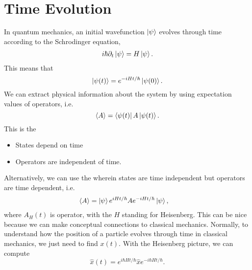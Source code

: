 \documentclass{article}
\numberwithin{equation}{section}
\begin{document}
\section{Time Evolution}
In quantum mechanics, an initial wavefunction $\ket{\psi}$ evolves through time according to the Schrodinger equation,
\begin{align}
    i\hbar\partial_t\ket{\psi} = H\ket{\psi}.
\end{align}
This means that 
\begin{equation}
    \ket{\psi(t)} = e^{-iHt/\hbar}\ket{\psi(0)}.
\end{equation}
We can extract physical information about the system by using expectation values of operators, i.e. 
\begin{equation}
    \langle A\rangle = \bra{\psi(t)}A\ket{\psi(t)}.
\end{equation}
This is the 
\begin{itemize}
    \item States depend on time
    \item Operators are independent of time.
\end{itemize}
Alternatively, we can use the  wherein states are time independent but operators are time dependent, i.e. 
\begin{align}
    \langle A\rangle &= \ket{\psi}e^{iHt/\hbar}Ae^{-iHt/\hbar}\ket{\psi},
\end{align}
where $A_H(t)$ is operator, with the $H$ standing for Heisenberg. This can be nice because we can make conceptual connections to classical mechanics. Normally, to understand how the position of a particle evolves through time in classical mechanics, we just need to find $x(t)$. With the Heisenberg picture, we can compute 
\begin{equation}
    \hat{x}(t) = e^{i\hbar{H}t/\hbar}\hat{x}e^{-i\hbar{H}t/\hbar}.
\end{equation}
\end{document}
